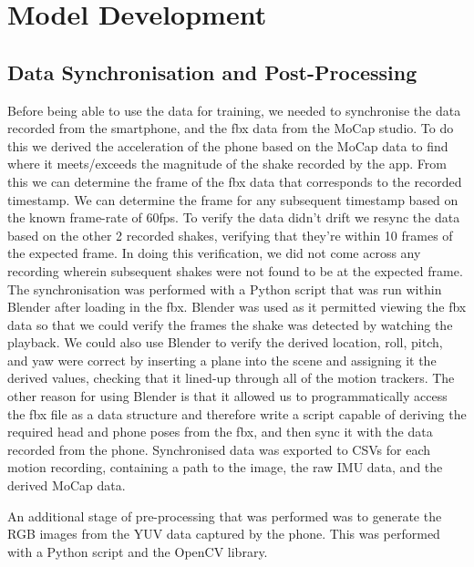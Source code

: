 \section{Model Development}

\subsection{Data Synchronisation and Post-Processing}
Before being able to use the data for training, we needed to synchronise the data recorded from the smartphone, and the fbx data from the MoCap studio.
To do this we derived the acceleration of the phone based on the MoCap data to find where it meets/exceeds the magnitude of the shake recorded by the app. From this we can determine the frame of the fbx data that corresponds to the recorded timestamp. We can determine the frame for any subsequent timestamp based on the known frame-rate of 60fps. 
To verify the data didn't drift we resync the data based on the other 2 recorded shakes, verifying that they're within 10 frames of the expected frame. In doing this verification, we did not come across any recording wherein subsequent shakes were not found to be at the expected frame.
The synchronisation was performed with a Python script that was run within Blender after loading in the fbx.
Blender was used as it permitted viewing the fbx data so that we could verify the frames the shake was detected by watching the playback. We could also use Blender to verify the derived location, roll, pitch, and yaw were correct by inserting a plane into the scene and assigning it the derived values, checking that it lined-up through all of the motion trackers.
The other reason for using Blender is that it allowed us to programmatically access the fbx file as a data structure and therefore write a script capable of deriving the required head and phone poses from the fbx, and then sync it with the data recorded from the phone.
Synchronised data was exported to CSVs for each motion recording, containing a path to the image, the raw IMU data, and the derived MoCap data.

An additional stage of pre-processing that was performed was to generate the RGB images from the YUV data captured by the phone. This was performed with a Python script and the OpenCV library.

